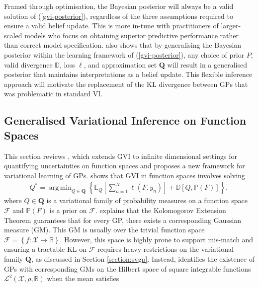 \documentclass{article}
\DeclareMathOperator*{\argmin}{arg\,min}
\numberwithin{equation}{section}
\begin{document}
Framed through optimisation, the Bayesian posterior will always be a valid solution of (\ref{gvi-posterior}), regardless of the three assumptions required to ensure a valid belief update.
This is more in-tune with practitioners of larger-scaled models who focus on obtaining superior predictive performance rather than correct model specification.
\cite{knoblauch2022optimization} also shows that by generalising the Bayesian posterior within the learning framework of (\ref{gvi-posterior}), any choice of prior $P$, valid divergence $\mathbb{D}$, loss $\ell$, and approximation set $\boldsymbol{Q}$ will result in a generalised posterior that maintains interpretations as a belief update.
This flexible inference approach will motivate the replacement of the KL divergence between GPs that was problematic in standard VI.

\subsection{Generalised Variational Inference on Function Spaces}
This section reviews \cite{wild2022generalized}, which extends GVI to infinite dimensional settings for quantifying uncertainties on function spaces and proposes  a new framework for variational learning of GPs.
\cite{wild2022generalized} shows that GVI in function spaces involves solving
\begin{align}
    Q^* = \argmin_{Q \in \boldsymbol{Q}} \left\{\mathbb{E}_{Q}\left[\sum_{n=1}^{N}\ell(F, y_n)\right] + \mathbb{D}\left[Q, \mathbb{P}(F)\right]\right\},
    \label{gvi-posterior-in-fs}
\end{align}
where $Q \in \boldsymbol{Q}$ is a variational family of probability measures on a function space $\boldsymbol{\mathcal{F}}$ and $\mathbb{P}(F)$ is a prior on $\boldsymbol{\mathcal{F}}$.
\cite{wild2022generalized} explains that the Kolomogorov Extension Theorem guarantees that for every GP, there exists a corresponding Gaussian measure (GM). 
This GM is usually over the trivial function space $\boldsymbol{\mathcal{F}} = \left\{f: \mathcal{X} \rightarrow \mathbb{R}\right\}$.
However, this space is highly prone to support mis-match and ensuring a tractable KL on $\boldsymbol{\mathcal{F}}$ requires heavy restrictions on the variational family $\boldsymbol{Q}$, as discussed in Section \ref{section:svgp}.
Instead, \cite{wild2022generalized} identifies the existence of GPs with corresponding GMs on the Hilbert space of square integrable functions $\mathcal{L}^2\left(\mathcal{X}, \rho, \mathbb{R}\right)$ when the mean satisfies
\end{document}
